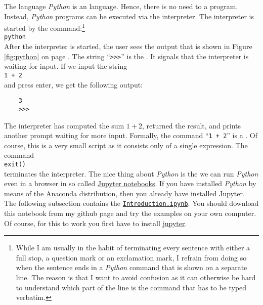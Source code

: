 The language \textsl{Python} is an  language.  Hence, there is no need to  a
program.  Instead, \textsl{Python} programs can be executed via the interpreter.  The interpreter is started
by the command:\footnote{
  While I am usually in the habit of terminating every sentence with either a full stop, a question
  mark or an exclamation mark, I refrain from doing so when the sentence ends in a \textsl{Python} command
  that is shown on a separate line.  The reason is that I want to avoid confusion as it can
  otherwise be hard to understand which part of the line is the command that has to be typed
  verbatim.
}
\\[0.2cm]
\hspace*{1.3cm}
\texttt{python}
\\[0.2cm]
After the interpreter is started, the user sees the output that is shown in Figure 
\ref{fig:python} on page \pageref{fig:python}.  The string
``\texttt{>>>}'' is the .  It signals that the interpreter is waiting for input.
If we input the string
\\[0.2cm]
\hspace*{1.3cm}
\texttt{1 + 2}
\\[0.2cm]
and press enter, we get the following output:
\begin{verbatim}
    3
    >>> 
\end{verbatim}
The interpreter has computed the sum $1+2$, returned the result, and prints another prompt waiting
for more input.  Formally, the command ``\texttt{1 + 2}''
is a .  Of course, this is a very small script as it consists only of a single expression.
The command
\\[0.2cm]
\hspace*{1.3cm}
\texttt{exit()}
\\[0.2cm]
terminates the interpreter.   The nice thing about \textsl{Python}  is the we can run \textsl{Python} even in a
browser in so called \href{https://en.wikipedia.org/wiki/Project_Jupyter}{Jupyter notebooks}.  If you have
installed \textsl{Python} by means of the \href{https://www.anaconda.com/download/}{Anaconda} distribution,
then you already have installed Jupyter.  The following subsection contains the  
\href{https://github.com/karlstroetmann/Logic/blob/master/Python/Introduction.ipynb}{\texttt{Introduction.ipynb}}.
You should download this notebook from my github page and try the examples on your own computer.  Of course,
for this to work you first have to install \href{https://jupyter.org}{jupyter}.

